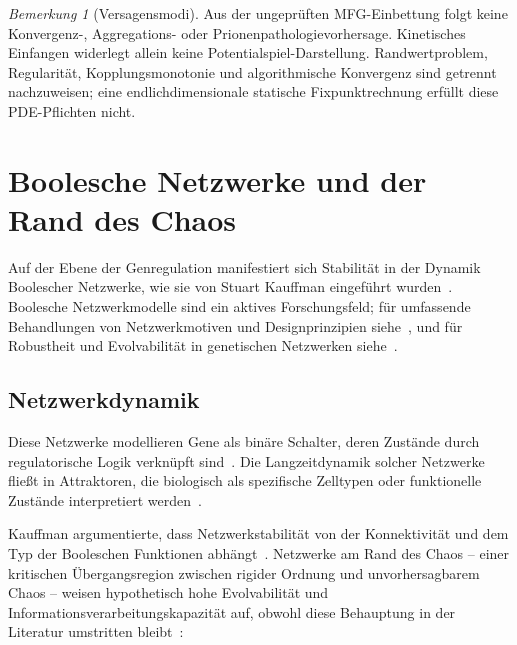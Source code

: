 \documentclass[12pt,a4paper]{article}
\theoremstyle{remark}
\newtheorem{remark}{Bemerkung}
\begin{document}
\begin{remark}[Versagensmodi]\label{rem:mfg-failure}
Aus der ungeprüften MFG-Einbettung folgt keine Konvergenz-, Aggregations- oder Prionenpathologievorhersage. Kinetisches Einfangen widerlegt allein keine Potentialspiel-Darstellung. Randwertproblem, Regularität, Kopplungsmonotonie und algorithmische Konvergenz sind getrennt nachzuweisen; eine endlichdimensionale statische Fixpunktrechnung erfüllt diese PDE-Pflichten nicht.
\end{remark}

\section{Boolesche Netzwerke und der Rand des Chaos}
\label{sec:boolean}

Auf der Ebene der Genregulation manifestiert sich Stabilität in der Dynamik Boolescher Netzwerke, wie sie von Stuart Kauffman eingeführt wurden~\citep{BooleanPost,KauffmanOrigins}. Boolesche Netzwerkmodelle sind ein aktives Forschungsfeld; für umfassende Behandlungen von Netzwerkmotiven und Designprinzipien siehe~\citet{AlonSystems2007}, und für Robustheit und Evolvabilität in genetischen Netzwerken siehe~\citet{WagnerRobustness2005}.

\subsection{Netzwerkdynamik}

Diese Netzwerke modellieren Gene als binäre Schalter, deren Zustände durch regulatorische Logik verknüpft sind~\citep{BooleanPost}. Die Langzeitdynamik solcher Netzwerke fließt in Attraktoren, die biologisch als spezifische Zelltypen oder funktionelle Zustände interpretiert werden~\citep{BooleanEvolution}.

Kauffman argumentierte, dass Netzwerkstabilität von der Konnektivität und dem Typ der Booleschen Funktionen abhängt~\citep{BooleanPost}. Netzwerke am \glqq Rand des Chaos\grqq{} -- einer kritischen Übergangsregion zwischen rigider Ordnung und unvorhersagbarem Chaos -- weisen hypothetisch hohe Evolvabilität und Informationsverarbeitungskapazität auf, obwohl diese Behauptung in der Literatur umstritten bleibt~\citep{KauffmanOrigins}:
\end{document}
